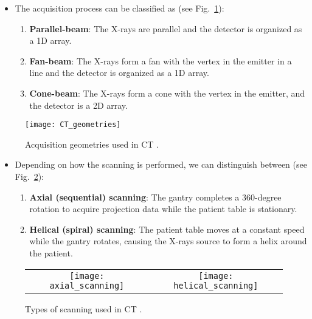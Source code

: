 \begin{itemize}
\item The acquisition process can be classified as
(see Fig.~\ref{fig:CT_geometries}):
\begin{enumerate}
\item \textbf{Parallel-beam}: The X-rays are parallel and the detector
  is organized as a 1D array.
\item \textbf{Fan-beam}: The X-rays form a fan with the vertex in the
  emitter in a line and the detector is organized as a 1D array.
\item \textbf{Cone-beam}: The X-rays form a cone with the
  vertex in the emitter, and the detector is a 2D array.
\end{enumerate}
\end{itemize}
\vspace{-1ex}
\begin{figure}[H]
  \centering
  \texttt{[image: CT\_geometries]}
  \caption{Acquisition geometries used in CT \cite{takase2025CT}.\label{fig:CT_geometries}}
\end{figure}

\begin{itemize}
\item Depending on how the scanning is performed, we can distinguish between
(see Fig.~\ref{fig:scannings}):
\begin{enumerate}
\item \textbf{Axial (sequential) scanning}:
  The gantry completes a 360-degree rotation to acquire projection
  data while the patient table is stationary. 
\item \textbf{Helical (spiral) scanning}: The patient table moves
  at a constant speed while the gantry rotates, causing the X-rays
  source to form a helix around the patient.
\end{enumerate}
\end{itemize}
\begin{figure}[H]
  \centering
  \begin{tabular}{cc}
    \texttt{[image: axial\_scanning]} & \texttt{[image: helical\_scanning]}
  \end{tabular}
  \caption{Types of scanning used in CT \cite{abdulla2025acquiring1}.\label{fig:scannings}}
\end{figure}

